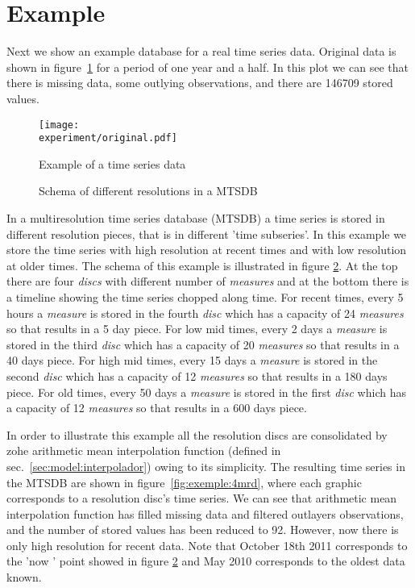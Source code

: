 \section{Example}

Next we show an example database for a real time series data. Original
data is shown in figure~\ref{fig:exemple:original} for a period of one
year and a half. In this plot we can see that there is missing
data, some outlying observations, and there are 146709 stored values.


\begin{figure}[tp]
\centering
\texttt{[image: \\experiment/original.pdf]}
\caption{Example of a time series data}
\label{fig:exemple:original}
\end{figure}



\begin{figure}[tp]
\centering

\caption{Schema of different resolutions in a MTSDB}
\label{fig:exemple:window}
\end{figure}


In a multiresolution time series database (MTSDB) a time series is
stored in different resolution pieces, that is in different 'time
subseries'.  In this example we store the time series with high
resolution at recent times and with low resolution at older times. The
schema of this example is illustrated in figure
\ref{fig:exemple:window}. At the top there are four \emph{discs} with
different number of \emph{measures} and at the bottom there is a
timeline showing the time series chopped along time. For recent times,
every 5 hours a \emph{measure} is stored in the fourth \emph{disc}
which has a capacity of 24 \emph{measures} so that results in a 5 day
piece. For low mid times, every 2 days a \emph{measure} is stored in
the third \emph{disc} which has a capacity of 20 \emph{measures} so
that results in a 40 days piece. For high mid times, every 15 days a
\emph{measure} is stored in the second \emph{disc} which has a
capacity of 12 \emph{measures} so that results in a 180 days
piece. For old times, every 50 days a \emph{measure} is stored in the
first \emph{disc} which has a capacity of 12 \emph{measures} so that
results in a 600 days piece.


In order to illustrate this example all the resolution discs are
consolidated by zohe arithmetic mean interpolation function
(defined in sec.~\ref{sec:model:interpolador}) owing to its simplicity. The
resulting time series in the MTSDB are shown in
figure~\ref{fig:exemple:4mrd}, where each graphic corresponds to a
resolution disc's time series. We can see that arithmetic mean
interpolation function has filled missing data and filtered outlayers
observations, and the number of stored values has been reduced to
92. However, now there is only high resolution for recent data. Note
that October 18th 2011 corresponds to the 'now ' point showed in
figure \ref{fig:exemple:window} and May 2010 corresponds to the oldest
data known.

